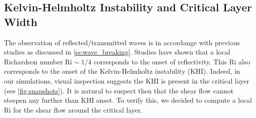 \documentclass[
        fleqn,
        usenatbib,
    ]{mnras}
\begin{document}
\subsection{Kelvin-Helmholtz Instability and Critical Layer Width}\label{ss:khi}

The observation of reflected/transmitted waves is in accordange with previous
studies as discussed in \autoref{ss:wave_breaking}. Studies have shown that a
local Richardson number $\mathrm{Ri} \sim 1/4$ corresponds to the onset of
reflectivity. This $\mathrm{Ri}$ also corresponds to the onset of the
Kelvin-Helmholtz instability (KHI). Indeed, in our simulations, visual
inspection suggests the KHI is present in the critical layer (see
\autoref{fig:snapshots}). It is natural to suspect then that the shear flow
cannot steepen any further than KHI onset. To verify this, we decided to compute
a local $\mathrm{Ri}$ for the shear flow around the critical layer.
\end{document}
